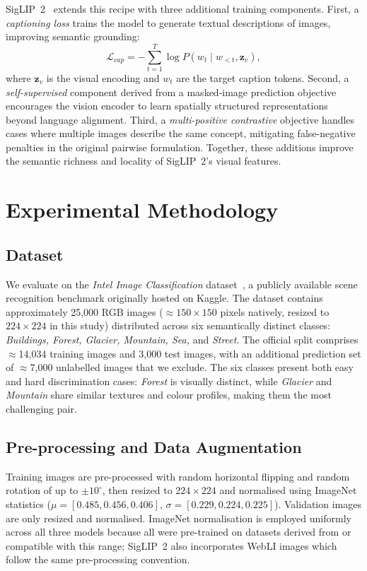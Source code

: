 \documentclass[journal]{IEEEtran}
\begin{document}
SigLIP~2~\cite{tschannen2025siglip2} extends this recipe with three additional training
components. First, a \textit{captioning loss} trains the model to generate textual descriptions
of images, improving semantic grounding:
\begin{equation}
    \mathcal{L}_{cap} = -\sum_{t=1}^{T} \log P(w_t \mid w_{<t}, \mathbf{z}_v),
    \label{eq:cap_loss}
\end{equation}
where $\mathbf{z}_v$ is the visual encoding and $w_t$ are the target caption tokens.
Second, a \textit{self-supervised} component derived from a masked-image prediction
objective encourages the vision encoder to learn spatially structured representations
beyond language alignment. Third, a \textit{multi-positive contrastive} objective handles
cases where multiple images describe the same concept, mitigating false-negative
penalties in the original pairwise formulation. Together, these additions improve the
semantic richness and locality of SigLIP~2's visual features.

\section{Experimental Methodology}
\label{sec:methodology}

\subsection{Dataset}
We evaluate on the \textit{Intel Image Classification} dataset~\cite{intelDataset},
a publicly available scene recognition benchmark originally hosted on Kaggle.
The dataset contains approximately 25,000 RGB images ($\approx150\times150$ pixels
natively, resized to $224\times224$ in this study) distributed across six semantically
distinct classes: \textit{Buildings, Forest, Glacier, Mountain, Sea,} and \textit{Street}.
The official split comprises $\approx$14,034 training images and 3,000 test images,
with an additional prediction set of $\approx$7,000 unlabelled images that we exclude.
The six classes present both easy and hard discrimination cases: \textit{Forest} is
visually distinct, while \textit{Glacier} and \textit{Mountain} share similar
textures and colour profiles, making them the most challenging pair.

\subsection{Pre-processing and Data Augmentation}
Training images are pre-processed with random horizontal flipping and random
rotation of up to $\pm 10^{\circ}$, then resized to $224\times224$ and normalised
using ImageNet statistics ($\mu = [0.485, 0.456, 0.406]$, $\sigma = [0.229, 0.224, 0.225]$).
Validation images are only resized and normalised. ImageNet normalisation is employed
uniformly across all three models because all were pre-trained on datasets derived from
or compatible with this range; SigLIP~2 also incorporates WebLI images which
follow the same pre-processing convention.
\end{document}
